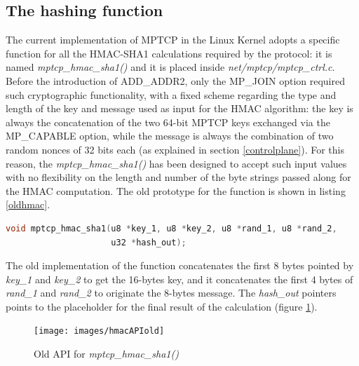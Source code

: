 
\subsection{The hashing function}
\label{newhash}
The current implementation of MPTCP in the Linux Kernel adopts a specific function for all the HMAC-SHA1 calculations required by the protocol: it is named \textit{mptcp\_hmac\_sha1()} and it is placed inside \textit{net/mptcp/mptcp\_ctrl.c}. Before the introduction of ADD\_ADDR2, only the MP\_JOIN option required such cryptographic functionality, with a fixed scheme regarding the type and length of the key and message used as input for the HMAC algorithm: the key is always the concatenation of the two 64-bit MPTCP keys exchanged via the MP\_CAPABLE option, while the message is always the combination of two random nonces of 32 bits each (as explained in section \ref{controlplane}). For this reason, the \textit{mptcp\_hmac\_sha1()} has been designed to accept such input values with no flexibility on the length and number of the byte strings passed along for the HMAC computation. The old prototype for the function is shown in listing \ref{oldhmac}.

\begin{lstlisting}[language=c, caption=Prototype for the old \textit{mptcp\_hmac\_sha1()} function, label=oldhmac]
void mptcp_hmac_sha1(u8 *key_1, u8 *key_2, u8 *rand_1, u8 *rand_2,
                     u32 *hash_out);
\end{lstlisting}

The old implementation of the function concatenates the first 8 bytes pointed by \textit{key\_1} and \textit{key\_2} to get the 16-bytes key, and it concatenates the first 4 bytes of \textit{rand\_1} and \textit{rand\_2} to originate the 8-bytes message. The \textit{hash\_out} pointers points to the placeholder for the final result of the calculation (figure \ref{fig:hmacapiold}).

\begin{figure}[!htb]
\centering
\texttt{[image: images/hmacAPIold]}
\caption{Old API for \textit{mptcp\_hmac\_sha1()} \cite{rfc6824bis04}}
\label{fig:hmacapiold}
\end{figure}

